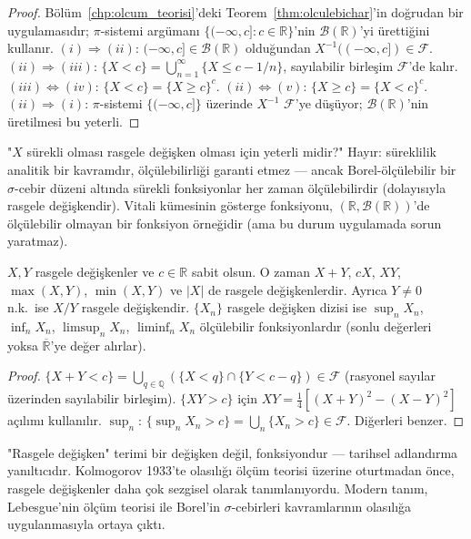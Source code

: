 \begin{proof}
Bölüm~\ref{chp:olcum_teorisi}'deki Teorem~\ref{thm:olculebichar}'in doğrudan
bir uygulamasıdır; $\pi$-sistemi argümanı $\{(-\infty, c] : c \in \mathbb{R}\}$'nin
$\mathcal{B}(\mathbb{R})$'yi ürettiğini kullanır.
$(i) \Rightarrow (ii)$: $(-\infty, c] \in \mathcal{B}(\mathbb{R})$ olduğundan $X^{-1}((-\infty, c]) \in \mathcal{F}$.
$(ii) \Rightarrow (iii)$: $\{X < c\} = \bigcup_{n=1}^\infty \{X \leq c - 1/n\}$,
sayılabilir birleşim $\mathcal{F}$'de kalır.
$(iii) \Leftrightarrow (iv)$: $\{X < c\} = \{X \geq c\}^c$.
$(ii) \Leftrightarrow (v)$: $\{X \geq c\} = \{X < c\}^c$.
$(ii) \Rightarrow (i)$: $\pi$-sistemi $\{(-\infty, c]\}$ üzerinde
$X^{-1}$ $\mathcal{F}$'ye düşüyor; $\mathcal{B}(\mathbb{R})$'nin üretilmesi bu yeterli.
\end{proof}

\begin{kritiksorgu}
"$X$ sürekli olması rasgele değişken olması için yeterli midir?"
Hayır: süreklilik analitik bir kavramdır, ölçülebilirliği garanti etmez ---
ancak Borel-ölçülebilir bir $\sigma$-cebir düzeni altında sürekli fonksiyonlar
her zaman ölçülebilirdir (dolayısıyla rasgele değişkendir).
Vitali kümesinin gösterge fonksiyonu, $(\mathbb{R}, \mathcal{B}(\mathbb{R}))$'de
ölçülebilir olmayan bir fonksiyon örneğidir (ama bu durum uygulamada sorun yaratmaz).
\end{kritiksorgu}

\begin{onerme}
\label{prop:rd_cebir}
$X, Y$ rasgele değişkenler ve $c \in \mathbb{R}$ sabit olsun. O zaman
$X + Y$, $cX$, $XY$, $\max(X, Y)$, $\min(X, Y)$ ve $|X|$ de rasgele değişkenlerdir.
Ayrıca $Y \neq 0$ n.k.\ ise $X/Y$ rasgele değişkendir.
$\{X_n\}$ rasgele değişken dizisi ise $\sup_n X_n$, $\inf_n X_n$,
$\limsup_{n} X_n$, $\liminf_n X_n$ ölçülebilir fonksiyonlardır
(sonlu değerleri yoksa $\overline{\mathbb{R}}$'ye değer alırlar).
\end{onerme}

\begin{proof}
$\{X + Y < c\} = \bigcup_{q \in \mathbb{Q}} (\{X < q\} \cap \{Y < c-q\}) \in \mathcal{F}$
(rasyonel sayılar üzerinden sayılabilir birleşim).
$\{XY > c\}$ için $XY = \tfrac{1}{4}[(X+Y)^2 - (X-Y)^2]$ açılımı kullanılır.
$\sup_n$: $\{\sup_n X_n > c\} = \bigcup_n \{X_n > c\} \in \mathcal{F}$.
Diğerleri benzer.
\end{proof}

\begin{tarihselnot}
"Rasgele değişken" terimi bir değişken değil, fonksiyondur --- tarihsel adlandırma yanıltıcıdır.
Kolmogorov 1933'te olasılığı ölçüm teorisi üzerine oturtmadan önce,
rasgele değişkenler daha çok sezgisel olarak tanımlanıyordu.
Modern tanım, Lebesgue'nin ölçüm teorisi ile Borel'in $\sigma$-cebirleri
kavramlarının olasılığa uygulanmasıyla ortaya çıktı.
\end{tarihselnot}

